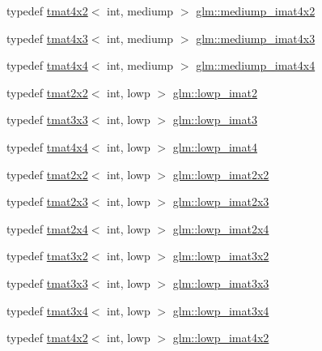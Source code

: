 \begin{DoxyCompactItemize}
typedef \hyperlink{structglm_1_1tmat4x2}{tmat4x2}$<$ int, mediump $>$ \hyperlink{group__gtc__matrix__integer_gabfe107153637dfd7a0c272ff1ba892ed}{glm\+::mediump\+\_\+imat4x2}
\item 
typedef \hyperlink{structglm_1_1tmat4x3}{tmat4x3}$<$ int, mediump $>$ \hyperlink{group__gtc__matrix__integer_ga0da8b13e141337d016a6541ea2c0362c}{glm\+::mediump\+\_\+imat4x3}
\item 
typedef \hyperlink{structglm_1_1tmat4x4}{tmat4x4}$<$ int, mediump $>$ \hyperlink{group__gtc__matrix__integer_gae226af929e72730be59a58d89a4be028}{glm\+::mediump\+\_\+imat4x4}
\item 
typedef \hyperlink{structglm_1_1tmat2x2}{tmat2x2}$<$ int, lowp $>$ \hyperlink{group__gtc__matrix__integer_ga4840a4d8b9e8997f1173da9e8e5e4de4}{glm\+::lowp\+\_\+imat2}
\item 
typedef \hyperlink{structglm_1_1tmat3x3}{tmat3x3}$<$ int, lowp $>$ \hyperlink{group__gtc__matrix__integer_ga2f7d17630aa9e27bb9e62f98603a4d7e}{glm\+::lowp\+\_\+imat3}
\item 
typedef \hyperlink{structglm_1_1tmat4x4}{tmat4x4}$<$ int, lowp $>$ \hyperlink{group__gtc__matrix__integer_gad9a60f2ee78750d31b129c01096751b6}{glm\+::lowp\+\_\+imat4}
\item 
typedef \hyperlink{structglm_1_1tmat2x2}{tmat2x2}$<$ int, lowp $>$ \hyperlink{group__gtc__matrix__integer_gad1950bd75bc033e8511cec3deb15af56}{glm\+::lowp\+\_\+imat2x2}
\item 
typedef \hyperlink{structglm_1_1tmat2x3}{tmat2x3}$<$ int, lowp $>$ \hyperlink{group__gtc__matrix__integer_ga00e00501dd9bf929e1dca7a167ba526b}{glm\+::lowp\+\_\+imat2x3}
\item 
typedef \hyperlink{structglm_1_1tmat2x4}{tmat2x4}$<$ int, lowp $>$ \hyperlink{group__gtc__matrix__integer_gaf664d339f1b66e62ed07c913e60be940}{glm\+::lowp\+\_\+imat2x4}
\item 
typedef \hyperlink{structglm_1_1tmat3x2}{tmat3x2}$<$ int, lowp $>$ \hyperlink{group__gtc__matrix__integer_ga93514d2df726334e6d5edd373635d343}{glm\+::lowp\+\_\+imat3x2}
\item 
typedef \hyperlink{structglm_1_1tmat3x3}{tmat3x3}$<$ int, lowp $>$ \hyperlink{group__gtc__matrix__integer_ga434abdeee9a8908660691be659f6693f}{glm\+::lowp\+\_\+imat3x3}
\item 
typedef \hyperlink{structglm_1_1tmat3x4}{tmat3x4}$<$ int, lowp $>$ \hyperlink{group__gtc__matrix__integer_ga61fe3487c1f4f10fb0f5c9fa0873a694}{glm\+::lowp\+\_\+imat3x4}
\item 
typedef \hyperlink{structglm_1_1tmat4x2}{tmat4x2}$<$ int, lowp $>$ \hyperlink{group__gtc__matrix__integer_ga87e2118b22cbc6916805aafcda52a943}{glm\+::lowp\+\_\+imat4x2}

\end{DoxyCompactItemize}
